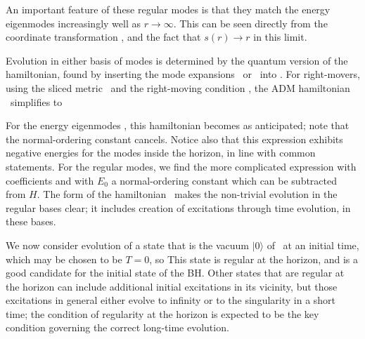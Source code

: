 An important feature of these regular modes is that they match the energy eigenmodes increasingly well as $r\rightarrow\infty$.  This can be seen directly from the coordinate transformation \XtorT, and the fact that $s(r)\rightarrow r$ in this limit.



Evolution in either basis of modes is determined by the quantum version of the hamiltonian, found by inserting the mode expansions \omexp\ or \kexp\  into \admham.  For right-movers, using the sliced metric \admvars\ and the right-moving condition \RMp, the ADM hamiltonian \admham\ simplifies to
%
\eqn{}
%

For the energy eigenmodes \omps, this hamiltonian becomes
%
\eqn{}
%
as anticipated; note that the normal-ordering constant cancels.  Notice also that this expression exhibits negative energies for the modes inside the horizon, in line with  common statements. For the regular modes, we find the more complicated expression
%
\eqn{}
%
with coefficients
%
\eqn{}
%
and with $E_0$ a normal-ordering constant which can be subtracted from $H$.  The form of the hamiltonian \hamreg\ makes the non-trivial evolution in the regular bases clear; it includes creation of excitations through time evolution, in these bases.


We now consider evolution of a state that is the vacuum $|0\rangle$ of \rvac\ at an initial time, which may be chosen to be $T=0$, so
%
\eqn{}
%
 This state is regular at the horizon, and is a good candidate for the initial state of the BH.  Other states that are regular at the horizon can include additional initial excitations in its vicinity, but those excitations in general either evolve to infinity or to the singularity in a short time; the condition of regularity at the horizon is expected to be the key condition governing the correct long-time evolution.
 
